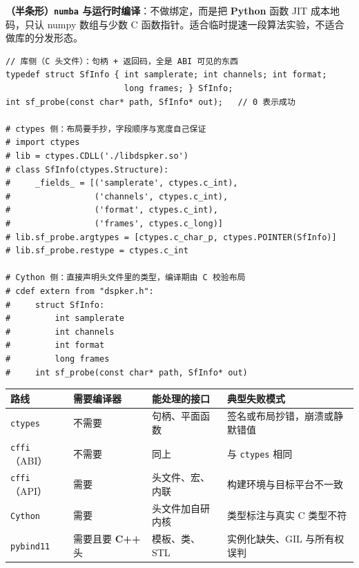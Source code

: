 \documentclass[12pt,a4paper,fontset=fandol]{ctexbook}
\newcommand{\Tp}[1]{\texttt{#1}}
\newcommand{\Lang}[1]{\textsf{\bfseries #1}}
\newcommand{\CPP}{\Lang{C++}}
\newcommand{\PY}{\Lang{Python}}
\begin{document}
\textbf{（半条形）\Tp{numba} 与运行时编译}：不做绑定，而是把 \PY{} 函数 JIT 成本地码，只认 numpy 数组与少数 C 函数指针。适合临时提速一段算法实验，不适合做库的分发形态。

\begin{lstlisting}[style=cstyle,caption={同一个 C 接口的三种声明：库侧、\Tp{ctypes} 侧、Cython 侧},label={lst:ch02-three}]
// 库侧（C 头文件）：句柄 + 返回码，全是 ABI 可见的东西
typedef struct SfInfo { int samplerate; int channels; int format;
                        long frames; } SfInfo;
int sf_probe(const char* path, SfInfo* out);   // 0 表示成功

# ctypes 侧：布局要手抄，字段顺序与宽度自己保证
# import ctypes
# lib = ctypes.CDLL('./libdspker.so')
# class SfInfo(ctypes.Structure):
#     _fields_ = [('samplerate', ctypes.c_int),
#                 ('channels', ctypes.c_int),
#                 ('format', ctypes.c_int),
#                 ('frames', ctypes.c_long)]
# lib.sf_probe.argtypes = [ctypes.c_char_p, ctypes.POINTER(SfInfo)]
# lib.sf_probe.restype = ctypes.c_int

# Cython 侧：直接声明头文件里的类型，编译期由 C 校验布局
# cdef extern from "dspker.h":
#     struct SfInfo:
#         int samplerate
#         int channels
#         int format
#         long frames
#     int sf_probe(const char* path, SfInfo* out)
\end{lstlisting}

\begin{compare}[title={五条绑定路线的代价对照}]
\begin{tabular}{@{}>{\raggedright\arraybackslash}p{}
  >{\raggedright\arraybackslash}p{}
  >{\raggedright\arraybackslash}p{}
  >{\raggedright\arraybackslash}p{}@{}}
\toprule
路线 & 需要编译器 & 能处理的接口 & 典型失败模式 \\
\midrule
\Tp{ctypes} & 不需要 & 句柄、平面函数 &
  签名或布局抄错，崩溃或静默错值 \\
\Tp{cffi}（ABI） & 不需要 & 同上 &
  与 \Tp{ctypes} 相同 \\
\Tp{cffi}（API） & 需要 & 头文件、宏、内联 &
  构建环境与目标平台不一致 \\
\Tp{Cython} & 需要 & 头文件加自研内核 &
  类型标注与真实 C 类型不符 \\
\Tp{pybind11} & 需要且要 \CPP{} 头 & 模板、类、STL &
  实例化缺失、GIL 与所有权误判 \\
\bottomrule
\end{tabular}
\end{compare}
\end{document}
